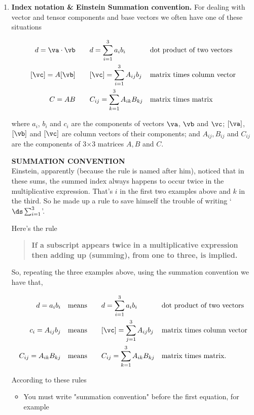 \documentclass[11pt]{article}
\begin{document}
\begin{enumerate}
\item \textbf{Index notation \& Einstein Summation convention.}  For dealing with vector and tensor components and base vectors we often have one of these situations 

\begin{align*}
d=\va \cdot \vb   \qquad &d= \sum_{i=1}^3 a_i b_i  &&\mbox{dot product of two vectors}\\
[\vc] = A[\vb]   \qquad&[\vc] = \sum_{i=1}^3 A_{ij}b_j &&\mbox{matrix times column  vector}\\
C = AB \qquad        &C_{ij}= \sum_{k=1}^3A_{ik}B_{kj}  && \mbox{matrix times matrix}
\end{align*} 

where $a_i$, $b_i$ and $c_i$ are the components of vectors $\va$, $\vb$ and $\vc$; $[\va]$, $[\vb]$ and  $[\vc]$ are column vectors of their components; and $A_{ij}, B_{ij}$ and $C_{ij}$ are the components of  3$\times$3 matrices $A, B$ and $C$. 

\medskip\par
\textbf{SUMMATION CONVENTION}
\null\\
Einstein, apparently (because the rule is named after him), noticed that in these sums, the summed index always happens to occur twice in the multiplicative expression. That's $i$ in the first two examples above and $k$ in the third.  So he made up a rule to save himself the trouble of writing `$\ds \sum_{i=1}^3$'.

Here's the rule 
\bigskip
\begin{quotation}\noindent
{\bf
If a subscript appears twice in a multiplicative expression then adding up (summing), from one to three, is implied.}
\end{quotation}


So, repeating the three examples above,  using the summation convention we have that,

\begin{align*}
d= a_i b_i  \quad \mbox{means} \qquad &d= \sum_{i=1}^3 a_i b_i  &&\mbox{dot product of two vectors}\\
c_i = A_{ij}b_j \quad \mbox{means} \qquad&[\vc] = \sum_{j=1}^3 A_{ij}b_j &&\mbox{matrix times column  vector}\\
C_{ij}= A_{ik}B_{kj} \quad \mbox{means} \qquad &C_{ij}= \sum_{k=1}^3A_{ik}B_{kj}  && \mbox{matrix times matrix.}
\end{align*} 
 

According to these rules
\begin{itemize} 
\item You must  write "summation convention" before the first equation, for example


\end{itemize}
\end{enumerate}
\end{document}
